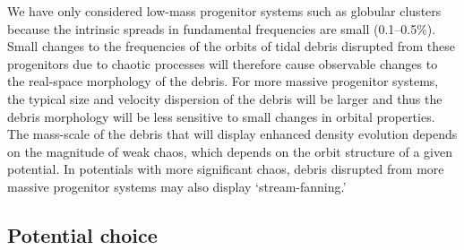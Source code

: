 \documentclass[letterpaper,12pt,preprint]{aastex}
\begin{document}
We have only considered low-mass progenitor systems such as globular clusters because the intrinsic spreads in fundamental frequencies are small (0.1--0.5\%). Small changes to the frequencies of the orbits of tidal debris disrupted from these progenitors due to chaotic processes will therefore cause observable changes to the real-space morphology of the debris. For more massive progenitor systems, the typical size and velocity dispersion of the debris will be larger and thus the debris morphology will be less sensitive to small changes in orbital properties. The mass-scale of the debris that will display enhanced density evolution depends on the magnitude of weak chaos, which depends on the orbit structure of a given potential. In potentials with more significant chaos, debris disrupted from more massive progenitor systems may also display `stream-fanning.'

\subsection{Potential choice}
\end{document}
